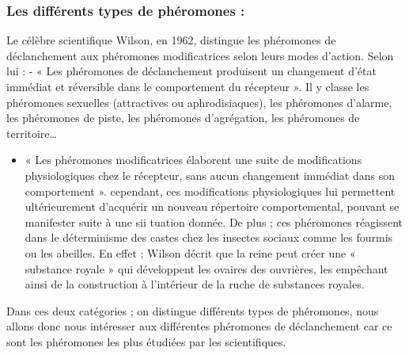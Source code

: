 \subsubsection{Les différents types de phéromones :}

Le célèbre scientifique Wilson, en 1962, distingue les phéromones de
déclanchement aux phéromones modificatrices selon leurs modes d'action.
Selon lui : - « Les phéromones de déclanchement produisent un changement
d'état immédiat et réversible dans le comportement du récepteur ». Il y
classe les phéromones sexuelles (attractives ou aphrodisiaques), les
phéromones d'alarme, les phéromones de piste, les phéromones
d'agrégation, les phéromones de territoire\ldots{}

\begin{itemize}
\itemsep1pt\parskip0pt
	\item « Les phéromones modificatrices élaborent une suite de modifications physiologiques chez le récepteur, sans aucun changement immédiat dans son comportement ». cependant, ces modifications physiologiques lui
	permettent ultérieurement d'acquérir un nouveau répertoire
	comportemental, pouvant se manifester suite à une sii tuation donnée. De
	plus ; ces phéromones réagissent dans le déterminisme des castes chez
	les insectes sociaux comme les fourmis ou les abeilles. En effet ;
	Wilson décrit que la reine peut créer une « substance royale » qui
	développent les ovaires des ouvrières, les empêchant ainsi de la
	construction à l'intérieur de la ruche de substances royales.
\end{itemize}

Dans ces deux catégories ; on distingue différents types de phéromones,
nous allons donc nous intéresser aux différentes phéromones de
déclanchement car ce sont les phéromones les plus étudiées par les
scientifiques.

